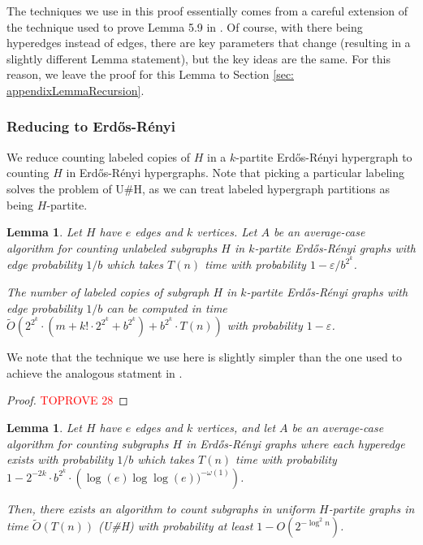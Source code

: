 \documentclass[11pt,letterpaper,pdftex]{article}
\newtheorem{lemma}[theorem]{Lemma}
\def\Otil{\tilde{O}}
\begin{document}
The techniques we use in this proof essentially comes from a careful extension of the technique used to prove Lemma 5.9 in \cite{factoredProblems}. Of course, with there being hyperedges instead of edges, there are key parameters that change (resulting in a slightly different Lemma statement), but the key ideas are the same. For this reason, we leave the proof for this Lemma to Section \ref{sec: appendixLemmaRecursion}.






\subsubsection{Reducing to Erd{\H{o}}s-R{\'{e}}nyi}
We reduce counting labeled copies of $H$ in a $k$-partite Erd{\H{o}}s-R{\'{e}}nyi hypergraph to counting $H$ in Erd{\H{o}}s-R{\'{e}}nyi hypergraphs. Note that picking a particular labeling solves the problem of U\#H, as we can treat labeled hypergraph partitions as being $H$-partite.

\begin{lemma}\label{lem: AC to HP count}
Let $H$ have $e$ edges and $k$ vertices. Let $A$ be an average-case algorithm for counting unlabeled subgraphs $H$ in $k$-partite Erd{\H{o}}s-R{\'{e}}nyi graphs with edge probability $1/b$ which takes $T(n)$ time with probability $1 - \varepsilon/b^{2^k }$.

The number of labeled copies of subgraph $H$ in $k$-partite Erd{\H{o}}s-R{\'{e}}nyi graphs with edge probability $1/b$ can be computed in time $\Otil \left(2^{2^k} \cdot \left(m + k!\cdot 2^{2^k } + b^{2^k }\right) + b^{2^k  } \cdot T(n) \right) $ with probability $1-\varepsilon$.
\end{lemma}

We note that the technique we use here is slightly simpler than the one used to achieve the analogous statment in \cite{factoredProblems}.


\begin{proof}\textcolor{red}{TOPROVE 28}\end{proof}

\begin{lemma} \label{lem:WCtoAC}
Let $H$ have $e$ edges and $k$ vertices, and let $A$ be an average-case algorithm for counting subgraphs $H$ in Erd{\H{o}}s-R{\'{e}}nyi graphs where each hyperedge exists with probability $1/b$ which takes $T(n)$ time with probability $1-2^{-2k}\cdot b^{2^k}\cdot\left(\log(e)\log\log(e))^{-\omega(1)}\right)$.

Then, there exists an algorithm to count subgraphs in uniform $H$-partite graphs in time $\Otil(T(n))$ (U\#H) with probability at least $1-O(2^{-\log^2{n} } )$.

\end{lemma}
\end{document}
